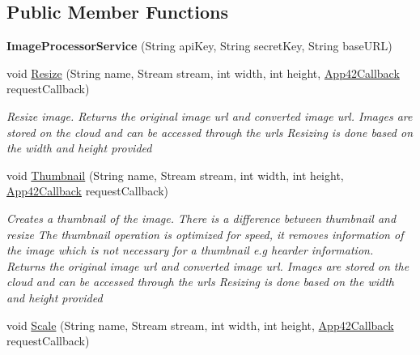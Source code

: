 \subsection*{Public Member Functions}
\begin{DoxyCompactItemize}
\item 
\hypertarget{classcom_1_1shephertz_1_1app42_1_1paas_1_1sdk_1_1windows_1_1image_processor_1_1_image_processor_service_ae19dcca6820d3ab1b45226dae881a448}{{\bfseries Image\+Processor\+Service} (String api\+Key, String secret\+Key, String base\+U\+R\+L)}\label{classcom_1_1shephertz_1_1app42_1_1paas_1_1sdk_1_1windows_1_1image_processor_1_1_image_processor_service_ae19dcca6820d3ab1b45226dae881a448}

\item 
void \hyperlink{classcom_1_1shephertz_1_1app42_1_1paas_1_1sdk_1_1windows_1_1image_processor_1_1_image_processor_service_aacd57bc888a2a6323e9a8a0460ae44ac}{Resize} (String name, Stream stream, int width, int height, \hyperlink{interfacecom_1_1shephertz_1_1app42_1_1paas_1_1sdk_1_1windows_1_1_app42_callback}{App42\+Callback} request\+Callback)
\begin{DoxyCompactList}\small\item\em Resize image. Returns the original image url and converted image url. Images are stored on the cloud and can be accessed through the urls Resizing is done based on the width and height provided \end{DoxyCompactList}\item 
void \hyperlink{classcom_1_1shephertz_1_1app42_1_1paas_1_1sdk_1_1windows_1_1image_processor_1_1_image_processor_service_a3f1219f47d1ecf1a58cc5b20bc87c46e}{Thumbnail} (String name, Stream stream, int width, int height, \hyperlink{interfacecom_1_1shephertz_1_1app42_1_1paas_1_1sdk_1_1windows_1_1_app42_callback}{App42\+Callback} request\+Callback)
\begin{DoxyCompactList}\small\item\em Creates a thumbnail of the image. There is a difference between thumbnail and resize The thumbnail operation is optimized for speed, it removes information of the image which is not necessary for a thumbnail e.\+g hearder information. Returns the original image url and converted image url. Images are stored on the cloud and can be accessed through the urls Resizing is done based on the width and height provided \end{DoxyCompactList}\item 
void \hyperlink{classcom_1_1shephertz_1_1app42_1_1paas_1_1sdk_1_1windows_1_1image_processor_1_1_image_processor_service_ae76b03bf61304d81a23379a570fbb9f4}{Scale} (String name, Stream stream, int width, int height, \hyperlink{interfacecom_1_1shephertz_1_1app42_1_1paas_1_1sdk_1_1windows_1_1_app42_callback}{App42\+Callback} request\+Callback)

\end{DoxyCompactItemize}
